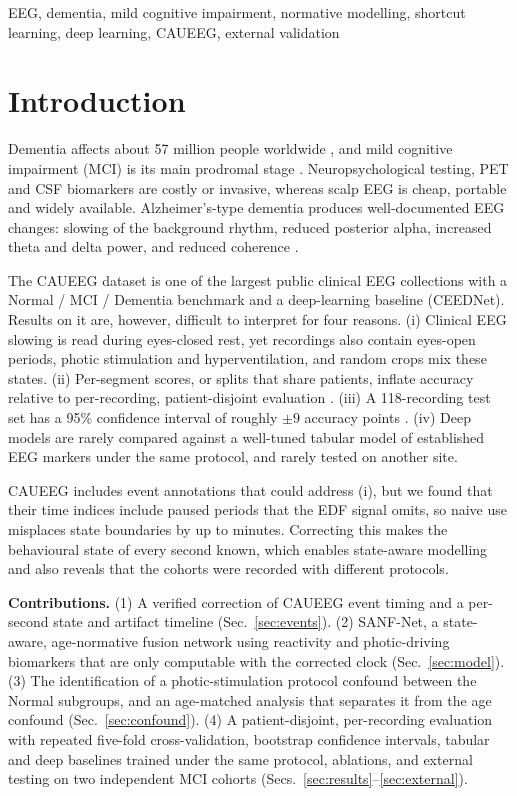 \documentclass[conference]{IEEEtran}
\begin{document}
\begin{IEEEkeywords}
EEG, dementia, mild cognitive impairment, normative modelling, shortcut learning,
deep learning, CAUEEG, external validation
\end{IEEEkeywords}

\section{Introduction}

Dementia affects about 57 million people worldwide \cite{who2023dementia}, and mild cognitive
impairment (MCI) is its main prodromal stage \cite{petersen2004mci}. Neuropsychological testing, PET
and CSF biomarkers are costly or invasive, whereas scalp EEG is cheap, portable and widely available.
Alzheimer's-type dementia produces well-documented EEG changes: slowing of the background rhythm,
reduced posterior alpha, increased theta and delta power, and reduced coherence
\cite{jeong2004eeg,dauwels2010diagnosis,babiloni2020measures}.

The CAUEEG dataset \cite{kim2023caueeg} is one of the largest public clinical EEG collections with a
Normal / MCI / Dementia benchmark and a deep-learning baseline (CEEDNet). Results on it are, however,
difficult to interpret for four reasons. (i) Clinical EEG slowing is read during eyes-closed rest, yet
recordings also contain eyes-open periods, photic stimulation and hyperventilation, and random crops
mix these states. (ii) Per-segment scores, or splits that share patients, inflate accuracy relative
to per-recording, patient-disjoint evaluation \cite{saeb2017voice}. (iii) A 118-recording test set has
a 95\% confidence interval of roughly $\pm 9$ accuracy points \cite{varoquaux2018cross}. (iv) Deep
models are rarely compared against a well-tuned tabular model of established EEG markers under the
same protocol, and rarely tested on another site.

CAUEEG includes event annotations that could address (i), but we found that their time indices
include paused periods that the EDF signal omits, so naive use misplaces state boundaries by up to
minutes. Correcting this makes the behavioural state of every second known, which enables
state-aware modelling and also reveals that the cohorts were recorded with different protocols.

\textbf{Contributions.}
(1) A verified correction of CAUEEG event timing and a per-second state and artifact timeline
(Sec.~\ref{sec:events}).
(2) SANF-Net, a state-aware, age-normative fusion network using reactivity and photic-driving
biomarkers that are only computable with the corrected clock (Sec.~\ref{sec:model}).
(3) The identification of a photic-stimulation protocol confound between the Normal subgroups, and
an age-matched analysis that separates it from the age confound (Sec.~\ref{sec:confound}).
(4) A patient-disjoint, per-recording evaluation with repeated five-fold cross-validation, bootstrap
confidence intervals, tabular and deep baselines trained under the same protocol, ablations, and
external testing on two independent MCI cohorts (Secs.~\ref{sec:results}--\ref{sec:external}).
\end{document}
